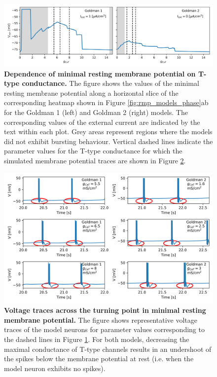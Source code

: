 \documentclass[../main.tex]{subfiles}
\begin{document}
\begin{figure}[!t]
    \centering
    \includegraphics[width=0.9\linewidth]{../img/rmp/goldman_1_2_i_slices.png}
    \caption[Dependence of minimal resting membrane potential on T-type conductance]{\textbf{Dependence of minimal resting membrane potential on T-type conductance.} The figure shows the values of the minimal resting membrane potential along a horizontal slice of the corresponding heatmap shown in Figure \ref{fig:rmp_models_phase}ab for the Goldman 1 (left) and Goldman 2 (right) models. The corresponding values of the external current are indicated by the text within each plot. Grey areas represent regions where the models did not exhibit bursting behaviour. Vertical dashed lines indicate the parameter values for the T-type conductance for which the simulated membrane potential traces are shown in Figure \ref{fig:rmp_models_phase_i_slices_voltage}.}
    \label{fig:rmp_models_phase_i_slices}
\end{figure}

\begin{figure}[!t]
    \centering
    \includegraphics[width=\linewidth]{../img/rmp/goldman_1_2_i_slices_vtraces.png}
    \caption[Voltage traces across the turning point in minimal resting membrane potential]{\textbf{Voltage traces across the turning point in minimal resting membrane potential.} The figure shows representative voltage traces of the model neurons for parameter values corresponding to the dashed lines in Figure \ref{fig:rmp_models_phase_i_slices}. For both models, decreasing the maximal conductance of T-type channels results in an undershoot of the spikes below the membrane potential at rest (i.e. when the model neuron exhibits no spikes).}
    \label{fig:rmp_models_phase_i_slices_voltage}
\end{figure}
\end{document}

